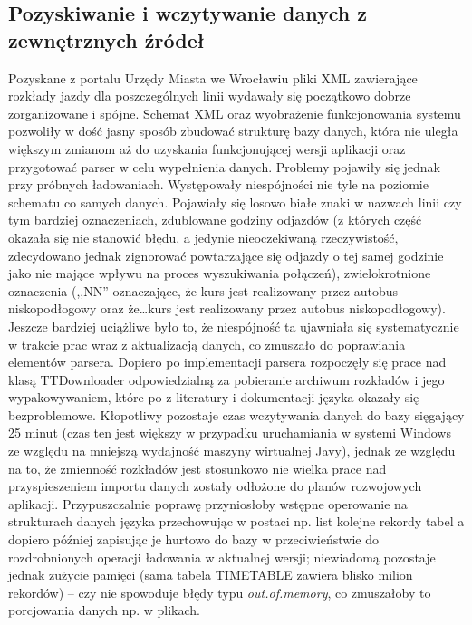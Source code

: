 \documentclass[a4paper,12pt]{article}
\begin{document}
  \subsection{Pozyskiwanie i wczytywanie danych z zewnętrznych źródeł }
  Pozyskane z portalu Urzędy Miasta we Wrocławiu pliki XML zawierające rozkłady
  jazdy dla poszczególnych linii wydawały się początkowo dobrze zorganizowane i
  spójne. Schemat XML oraz wyobrażenie funkcjonowania systemu pozwoliły w dość
  jasny sposób zbudować strukturę bazy danych, która nie uległa większym zmianom
  aż do uzyskania funkcjonującej wersji aplikacji oraz przygotować parser w
  celu wypełnienia danych. Problemy pojawiły się jednak przy próbnych
  ładowaniach. Występowały niespójności nie tyle na poziomie schematu co samych
  danych. Pojawiały się losowo białe znaki w nazwach linii czy tym bardziej
  oznaczeniach, zdublowane godziny odjazdów (z których część okazała się nie
  stanowić błędu, a jedynie nieoczekiwaną rzeczywistość, zdecydowano jednak
  zignorować powtarzające się odjazdy o tej samej godzinie jako nie mające
  wpływu na proces wyszukiwania połączeń), zwielokrotnione oznaczenia (,,NN''
  oznaczające, że kurs jest realizowany przez autobus niskopodłogowy oraz
  że\ldots kurs jest realizowany przez autobus niskopodłogowy). Jeszcze
  bardziej uciążliwe było to, że niespójność ta ujawniała się systematycznie w
  trakcie prac wraz z aktualizacją danych, co zmuszało do poprawiania
  elementów parsera. 
  Dopiero po implementacji parsera rozpoczęły się prace nad  klasą
  TTDownloader odpowiedzialną za pobieranie archiwum rozkładów i jego
  wypakowywaniem, które po z literatury i dokumentacji języka okazały się
  bezproblemowe.
  Kłopotliwy pozostaje czas wczytywania danych do bazy sięgający 25 minut
  (czas ten jest większy w przypadku uruchamiania w systemi Windows ze
  względu na mniejszą wydajność maszyny wirtualnej Javy), jednak ze względu na
  to, że zmienność rozkładów jest stosunkowo nie wielka prace nad
  przyspieszeniem importu danych zostały odłożone do planów rozwojowych
  aplikacji. Przypuszczalnie poprawę przyniosłoby wstępne operowanie na
  strukturach danych języka przechowując w postaci np. list kolejne rekordy
  tabel a dopiero później zapisując je hurtowo do bazy w przeciwieństwie do
  rozdrobnionych operacji ładowania w aktualnej wersji; niewiadomą pozostaje
  jednak zużycie pamięci (sama tabela TIMETABLE zawiera blisko milion
  rekordów) -- czy nie spowoduje błędy typu \emph{out.of.memory}, co zmuszałoby
  to porcjowania danych np. w plikach.
  
\end{document}
